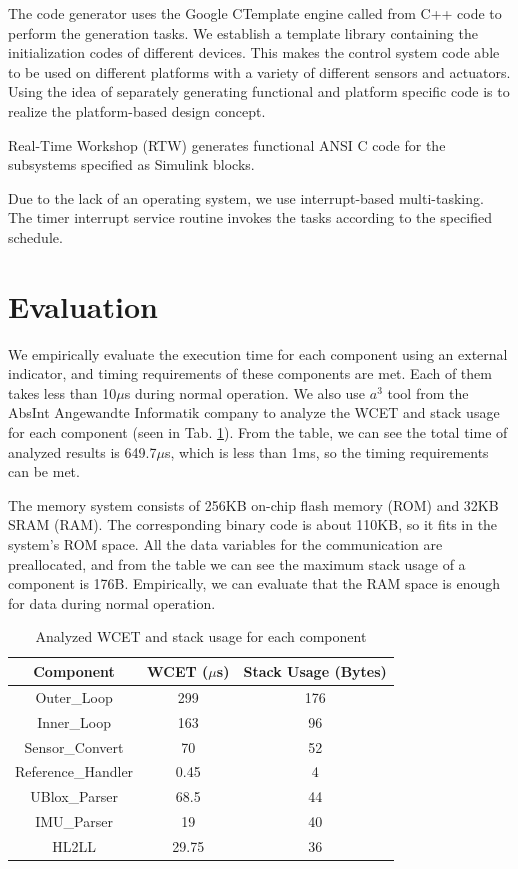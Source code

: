 \documentclass{acm_proc_article-sp}
\begin{document}
The code generator uses the Google CTemplate engine called from C++ code to perform the generation tasks. We establish a template library containing the initialization codes of different devices. This makes the control system code able to be used on different platforms with a variety of different sensors and actuators. Using the idea of separately generating functional and platform specific code is to realize the platform-based design concept.

Real-Time Workshop (RTW) generates functional ANSI C code for the subsystems specified as Simulink blocks.

Due to the lack of an operating system, we use interrupt-based multi-tasking. The timer interrupt service routine invokes the tasks according to the specified schedule.


\section{Evaluation}

We empirically evaluate the execution time for each component using an external indicator, and timing requirements of these components are met. Each of them takes less than 10$\mu$s during normal operation. We also use $a^3$ tool from the AbsInt Angewandte Informatik company to analyze the WCET and stack usage for each component (seen in Tab. \ref{table:TimingStackAnalyses}). From the table, we can see the total time of analyzed results is 649.7$\mu$s, which is less than 1ms, so the timing requirements can be met.

The memory system consists of 256KB on-chip flash memory (ROM) and 32KB SRAM (RAM). The corresponding binary code is about 110KB, so it fits in the system's ROM space. All the data variables for the communication are preallocated, and from the table we can see the maximum stack usage of a component is 176B. Empirically, we can evaluate that the RAM space is enough for data during normal operation.

\begin{table}
\centering
\caption{Analyzed WCET and stack usage for each component}
\begin{tabular}{|c|c|c|} \hline
Component&WCET ($\mu$s)&Stack Usage (Bytes) \\ \hline
Outer\_Loop & 299 & 176 \\ \hline
Inner\_Loop & 163 & 96 \\ \hline
Sensor\_Convert & 70 & 52 \\ \hline
Reference\_Handler & 0.45 & 4 \\ \hline
UBlox\_Parser & 68.5 & 44 \\ \hline
IMU\_Parser & 19 & 40 \\ \hline
HL2LL & 29.75 & 36 \\ \hline
\end{tabular}
\label{table:TimingStackAnalyses}
\end{table}
\end{document}
